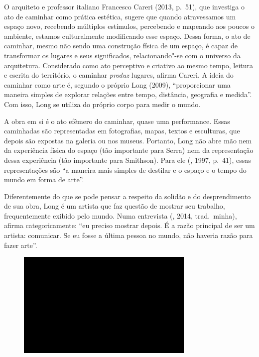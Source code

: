 O arquiteto e professor italiano Francesco Careri (2013, p.~51), que
investiga o ato de caminhar como prática estética, sugere que quando
atravessamos um espaço novo, recebendo múltiplos estímulos, percebendo e
mapeando aos poucos o ambiente, estamos culturalmente modificando esse
espaço. Dessa forma, o ato de caminhar, mesmo não sendo uma construção
física de um espaço, é capaz de transformar os lugares e seus
significados, relacionando"-se com o universo da arquitetura. Considerado
como ato perceptivo e criativo ao mesmo tempo, leitura e escrita do
território, o caminhar \emph{produz} lugares, afirma Careri. A ideia do
caminhar como arte é, segundo o próprio Long (2009), ``proporcionar uma
maneira simples de explorar relações entre tempo, distância, geografia e
medida''. Com isso, Long se utiliza do próprio corpo para medir o mundo.

A obra em si é o ato efêmero do caminhar, quase uma performance. Essas
caminhadas são representadas em fotografias, mapas, textos e esculturas,
que depois são expostas na galeria ou nos museus. Portanto, Long não
abre mão nem da experiência física do espaço (tão importante para Serra)
nem da representação dessa experiência (tão importante para Smithson).
Para ele (, 1997, p.~41), essas representações são ``a
maneira mais simples de destilar e o espaço e o tempo do mundo em forma
de arte''.

Diferentemente do que se pode pensar a respeito da solidão e do
desprendimento de sua obra, Long é um artista que faz questão de mostrar
seu trabalho, frequentemente exibido pelo mundo. Numa entrevista
(, 2014, trad.~minha), afirma categoricamente: ``eu preciso
mostrar depois. É a razão principal de ser um artista: comunicar. Se eu
fosse a última pessoa no mundo, não haveria razão para fazer arte''.

\begin{figure}[!ht]

\centering
 \includegraphics[width=85mm]{./imgs/im1.jpg}
\caption{\tiny{}}

\end{figure}

